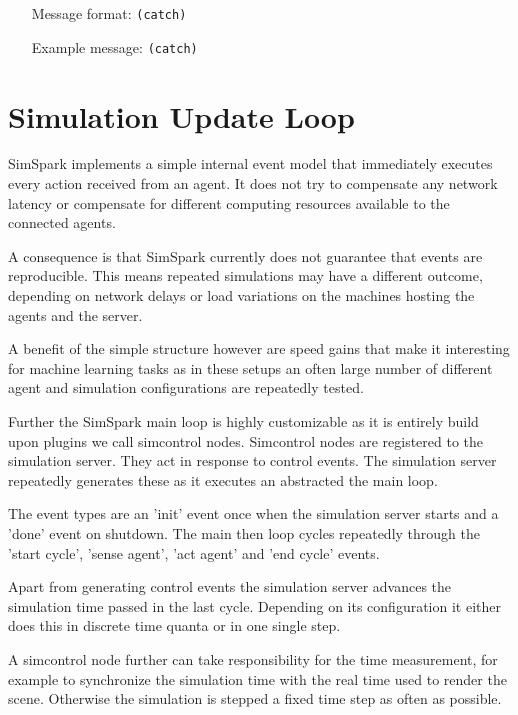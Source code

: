 \begin{itemize}
	\item[Message format:] \texttt{(catch)}
	\item[Example message:] \texttt{(catch)}
\end{itemize}






\section{Simulation Update Loop}
SimSpark implements a simple internal event model that immediately
executes every action received from an agent. It does not try to
compensate any network latency or compensate for different computing
resources available to the connected agents.

A consequence is that SimSpark currently does not guarantee that
events are reproducible. This means repeated simulations may have a
different outcome, depending on network delays or load variations on
the machines hosting the agents and the server.

A benefit of the simple structure however are speed gains that make it
interesting for machine learning tasks as in these setups an often
large number of different agent and simulation configurations are
repeatedly tested.

Further the SimSpark main loop is highly customizable as it is
entirely build upon plugins we call simcontrol nodes. Simcontrol nodes
are registered to the simulation server. They act in response to
control events. The simulation server repeatedly generates these as it
executes an abstracted the main loop.

The event types are an 'init' event once when the simulation server
starts and a 'done' event on shutdown. The main then loop cycles
repeatedly through the 'start cycle', 'sense agent', 'act agent' and
'end cycle' events.

Apart from generating control events the simulation server advances
the simulation time passed in the last cycle. Depending on its
configuration it either does this in discrete time quanta or in one
single step.

A simcontrol node further can take responsibility for the time
measurement, for example to synchronize the simulation time with the
real time used to render the scene.  Otherwise the simulation is
stepped a fixed time step as often as possible.

